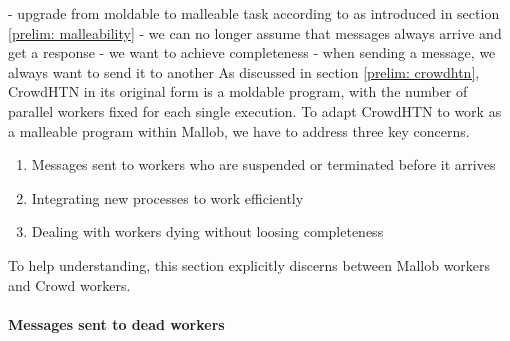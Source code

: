 - upgrade from moldable to malleable task according to \cite{feitelson1997job} as introduced in section \ref{prelim: malleability}
- we can no longer assume that messages always arrive and get a response
- we want to achieve completeness
- when sending a message, we always want to send it to another 
As discussed in section \ref{prelim: crowdhtn}, CrowdHTN in its original form is a moldable program, with the number of parallel workers fixed for each single execution. To adapt CrowdHTN to work as a malleable program within Mallob, we have to address three key concerns.
\begin{enumerate}
	\item Messages sent to workers who are suspended or terminated before it arrives
	\item Integrating new processes to work efficiently
	\item Dealing with workers dying without loosing completeness
\end{enumerate}
To help understanding, this section explicitly discerns between Mallob workers and Crowd workers. 
\paragraph{Messages sent to dead workers}

